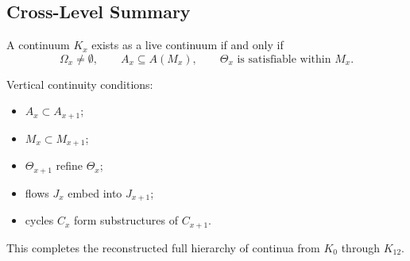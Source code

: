 \subsection{Cross-Level Summary}

A continuum \(K_x\) exists as a live continuum if and only if
\[
   \Omega_x \neq \emptyset,
   \qquad
   A_x \subseteq A(M_x),
   \qquad
   \Theta_x \text{ is satisfiable within } M_x.
\]

Vertical continuity conditions:
\begin{itemize}
    \item \(A_x \subset A_{x+1}\);
    \item \(M_x \subset M_{x+1}\);
    \item \(\Theta_{x+1}\) refine \(\Theta_x\);
    \item flows \(J_x\) embed into \(J_{x+1}\);
    \item cycles \(C_x\) form substructures of \(C_{x+1}\).
\end{itemize}

This completes the reconstructed full hierarchy of continua from
\(K_0\) through \(K_{12}\).
